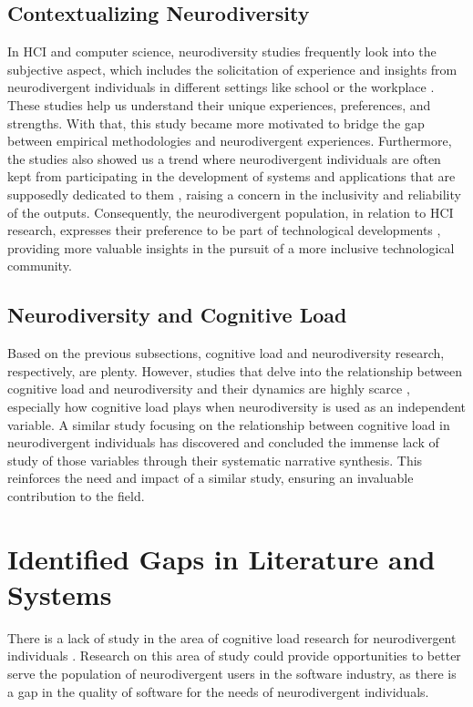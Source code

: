 \subsection{Contextualizing Neurodiversity}
In HCI and computer science, neurodiversity studies frequently look into the subjective aspect, which includes the solicitation of experience and insights from neurodivergent individuals in different settings like school \cite{burtscher2024, cognitive2025} or the workplace \cite{bowman2023, biondi2020, liu2024}. These studies help us understand their unique experiences, preferences, and strengths. With that, this study became more motivated to bridge the gap between empirical methodologies and neurodivergent experiences. Furthermore, the studies also showed us a trend where neurodivergent individuals are often kept from participating in the development of systems and applications that are supposedly dedicated to them \cite{bowman2023, kuang2024, lowy2023, skulmowski2022, spiel2022}, raising a concern in the inclusivity and reliability of the outputs. Consequently, the neurodivergent population, in relation to HCI research, expresses their preference to be part of technological developments \cite{kuang2024, liu2024, skulmowski2022}, providing more valuable insights in the pursuit of a more inclusive technological community. 

\subsection{Neurodiversity and Cognitive Load}
Based on the previous subsections, cognitive load and neurodiversity research, respectively, are plenty. However, studies that delve into the relationship between cognitive load and neurodiversity and their dynamics are highly scarce \cite{vilotijevic2022}, especially how cognitive load plays when neurodiversity is used as an independent variable. A similar study \cite{vilotijevic2022} focusing on the relationship between cognitive load in neurodivergent individuals has discovered and concluded the immense lack of study of those variables through their systematic narrative synthesis. This reinforces the need and impact of a similar study, ensuring an invaluable contribution to the field.

\section{Identified Gaps in Literature and Systems}
There is a lack of study in the area of cognitive load research for neurodivergent individuals  \cite{vilotijevic2022, bowman2023, biondi2020, liu2024}. Research on this area of study could provide opportunities to better serve the population of neurodivergent users in the software industry, as there is a gap in the quality of software for the needs of neurodivergent individuals.

